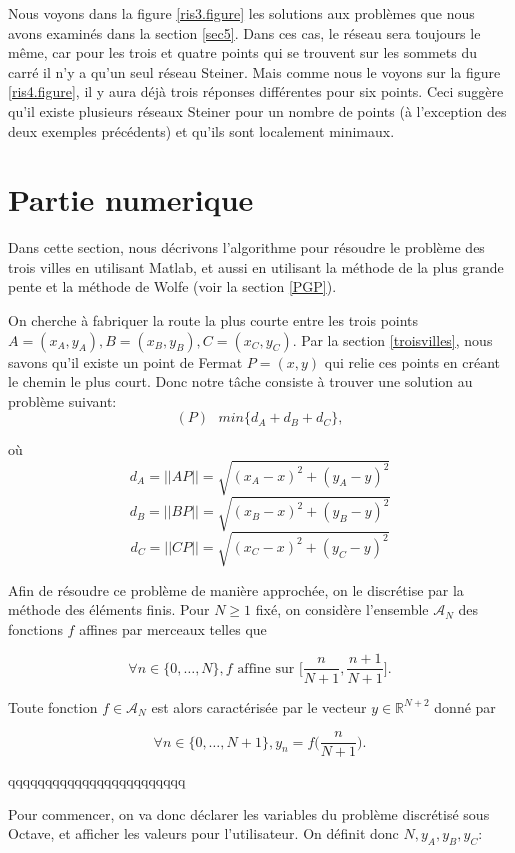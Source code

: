\documentclass[10pt,a4paper]{article}%
\theoremstyle{theorem}
\theoremstyle{definition}
\begin{document}
         		
         		Nous voyons dans la figure \ref{ris3.figure} les solutions aux problèmes que nous avons examinés dans la section \ref{sec5}. Dans ces cas, le réseau sera toujours le même, car pour les trois et quatre points qui se trouvent sur les sommets du carré il n'y a qu'un seul réseau Steiner. Mais comme nous le voyons sur la figure \ref{ris4.figure}, il y aura déjà trois réponses différentes pour six points. Ceci suggère qu'il existe plusieurs réseaux Steiner pour un nombre de points (à l'exception des deux exemples précédents) et qu'ils sont localement minimaux.
         		
	\section{Partie numerique}\label{partnum}
	
	Dans cette section, nous décrivons l'algorithme pour résoudre le problème des trois villes en utilisant Matlab, et aussi en utilisant la méthode de la plus grande pente et la méthode de Wolfe (voir la section \ref{PGP}).
	
	On cherche à fabriquer la route la plus courte entre les trois points $A=(x_A,y_A), B=(x_B,y_B), C=(x_C,y_C)$. Par la section \ref{troisvilles}, nous savons qu'il existe un point de Fermat $P=(x,y)$ qui relie ces points en créant le chemin le plus court.
	Donc notre tâche consiste à trouver une solution au problème suivant:
	\[(P) \text{       } min\{d_A+d_B+d_C\},\]
	
	où
	 \[d_A=||AP||=\sqrt{(x_A-x)^2+(y_A-y)^2}\]
	 \[d_B=||BP||=\sqrt{(x_B-x)^2+(y_B-y)^2}\]
	 \[d_C=||CP||=\sqrt{(x_C-x)^2+(y_C-y)^2}\]
	 
	 Afin de résoudre ce problème de manière approchée, on le discrétise par la méthode des éléments finis. Pour $N\ge 1$ fixé, on considère l'ensemble $\mathcal{A}_N$ des fonctions $f$ affines par merceaux telles que 
	 
	 \[\forall n \in \{0,\dots, N\}, f \text{ affine sur } \bigg[\frac{n}{N+1},\frac{n+1}{N+1}\bigg]. \]
	 
	 Toute fonction $f\in \mathcal{A}_N$ est alors caractérisée par le vecteur $y \in \mathbb{R}^{N+2}$  donné par
	 
	 \[\forall n \in \{0,\dots, N+1\}, y_n=f\bigg(\frac{n}{N+1}\bigg).\] 
	 
	 qqqqqqqqqqqqqqqqqqqqqqqq
	 
	 Pour commencer, on va donc déclarer les variables du problème discrétisé sous Octave, et afficher les valeurs pour l'utilisateur. On définit donc $N,y_A,y_B,y_C$:
	 
\end{document}
